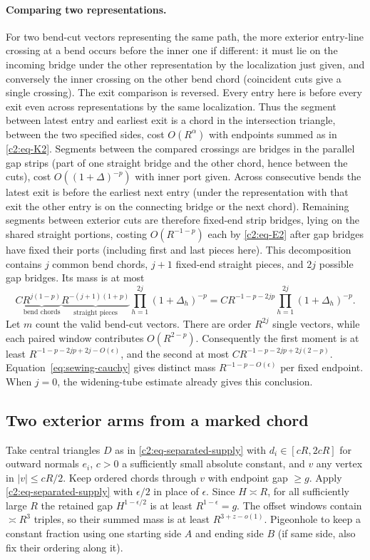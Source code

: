 \paragraph{Comparing two representations.}
For two bend-cut vectors representing the same path, the more exterior entry-line crossing at a bend occurs before the inner one if different: it must lie on the incoming bridge under the other representation by the localization just given, and conversely the inner crossing on the other bend chord (coincident cuts give a single crossing). The exit comparison is reversed. Every entry here is before every exit even across representations by the same localization. Thus the segment between latest entry and earliest exit is a chord in the intersection triangle, between the two specified sides, cost \(O(R^\alpha)\) with endpoints summed as in \eqref{c2:eq-K2}. Segments between the compared crossings are bridges in the parallel gap strips (part of one straight bridge and the other chord, hence between the cuts), cost \(O((1+\Delta)^{-p})\) with inner port given. Across consecutive bends the latest exit is before the earliest next entry (under the representation with that exit the other entry is on the connecting bridge or the next chord). Remaining segments between exterior cuts are therefore fixed-end strip bridges, lying on the shared straight portions, costing \(O(R^{-1-p})\) each by \eqref{c2:eq-E2} after gap bridges have fixed their ports (including first and last pieces here). This decomposition contains \(j\) common bend chords, \(j+1\)
fixed-end straight pieces, and \(2j\) possible gap bridges. Its mass is
at most
\[
 C\underbrace{R^{j(1-p)}}_{\text{bend chords}}
  \underbrace{R^{-(j+1)(1+p)}}_{\text{straight pieces}}
  \prod_{h=1}^{2j}(1+\Delta_h)^{-p}
 =C R^{-1-p-2jp}\prod_{h=1}^{2j}(1+\Delta_h)^{-p}.
\]
Let \(m\) count the valid bend-cut vectors. There are order \(R^{2j}\)
single vectors, while each paired window contributes \(O(R^{2-p})\).
Consequently the first moment is at least
\(R^{-1-p-2jp+2j-O(\epsilon)}\), and the second at most
\(C R^{-1-p-2jp+2j(2-p)}\). Equation~\eqref{eq:sewing-cauchy} gives
distinct mass \(R^{-1-p-O(\epsilon)}\) per fixed endpoint. When \(j=0\),
the widening-tube estimate already gives this conclusion.

\subsection{Two exterior arms from a marked chord}
Take central triangles $D$ as in \eqref{c2:eq-separated-supply} with
$d_i\in[cR,2cR]$ for outward normals $e_i$, $c>0$ a sufficiently small
absolute constant, and $v$ any vertex in $|v|\le cR/2$.  Keep ordered chords
through $v$ with endpoint gap $\ge g$.  Apply
\eqref{c2:eq-separated-supply} with $\epsilon/2$ in place of $\epsilon$.
Since $H\asymp R$, for all sufficiently large $R$ the retained gap
$H^{1-\epsilon/2}$ is at least $R^{1-\epsilon}=g$.  The offset windows
contain $\asymp R^3$ triples, so their summed mass is at least
$R^{3+z-o(1)}$.  Pigeonhole to
keep a constant fraction using one starting side $A$ and ending side $B$
(if same side, also fix their ordering along it).

